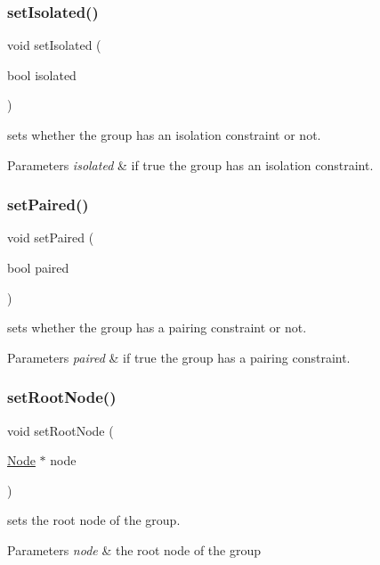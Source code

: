 \subsubsection{\texorpdfstring{set\+Isolated()}{setIsolated()}}
{\footnotesize\ttfamily void set\+Isolated (\begin{DoxyParamCaption}\item[{bool}]{isolated }\end{DoxyParamCaption})\hspace{0.3cm}{\ttfamily [inline]}}



sets whether the group has an isolation constraint or not. 


\begin{DoxyParams}{Parameters}
{\em isolated} & if true the group has an isolation constraint. \\
\hline
\end{DoxyParams}
\mbox{\label{class_open_chams_1_1_group_aff6de4e5c0da79ad8d0070c03bfd941b}} 
\subsubsection{\texorpdfstring{set\+Paired()}{setPaired()}}
{\footnotesize\ttfamily void set\+Paired (\begin{DoxyParamCaption}\item[{bool}]{paired }\end{DoxyParamCaption})\hspace{0.3cm}{\ttfamily [inline]}}



sets whether the group has a pairing constraint or not. 


\begin{DoxyParams}{Parameters}
{\em paired} & if true the group has a pairing constraint. \\
\hline
\end{DoxyParams}
\mbox{\label{class_open_chams_1_1_group_adc93b900e943312e905182fe44f21225}} 
\subsubsection{\texorpdfstring{set\+Root\+Node()}{setRootNode()}}
{\footnotesize\ttfamily void set\+Root\+Node (\begin{DoxyParamCaption}\item[{\hyperlink{class_open_chams_1_1_node}{Node} $\ast$}]{node }\end{DoxyParamCaption})\hspace{0.3cm}{\ttfamily [inline]}}



sets the root node of the group. 


\begin{DoxyParams}{Parameters}
{\em node} & the root node of the group \\
\hline
\end{DoxyParams}
